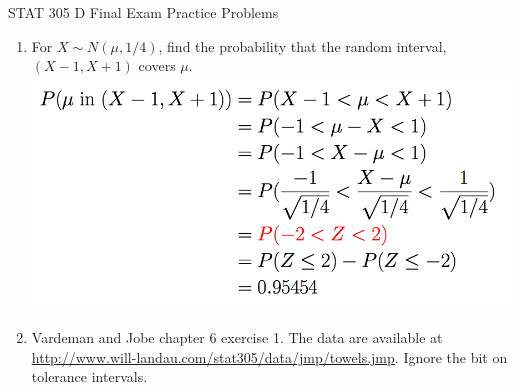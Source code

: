 \documentclass{article}\usepackage{graphicx, color}
\providecommand{\q}{$\quad$ \newline}
\numberwithin{equation}{section}
\begin{document}
\begin{flushleft}

\begin{center}
{\LARGE STAT 305 D Final Exam Practice Problems}
\end{center}

\begin{enumerate}[1. ]

\item For $X \sim N(\mu, 1/4)$, find the probability that the random interval, $(X - 1, X + 1)$ covers $\mu$.
 \includegraphics{../../fig/finalreviewp0sol.png}




\item Vardeman and Jobe chapter 6 exercise 1. The data are available at \url{http://www.will-landau.com/stat305/data/jmp/towels.jmp}. Ignore the bit on tolerance intervals. \q


\end{enumerate}
\end{flushleft}
\end{document}
